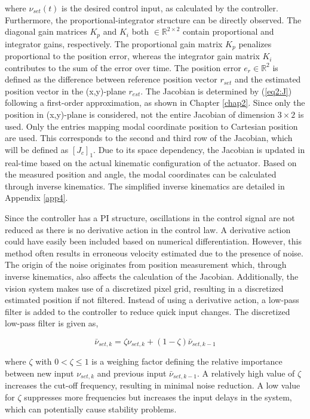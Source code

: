 where $\nu_{set}(t)$ is the desired control input, as calculated by the controller. Furthermore, the proportional-integrator structure can be directly observed. The diagonal gain matrices $K_p$ and $K_i$ both  $ \in \mathbb{R}^{2\times 2}$ contain proportional and integrator gains, respectively. The proportional gain matrix $K_p$ penalizes proportional to the position error, whereas the integrator gain matrix $K_i$ contributes to the sum of the error over time. The position error $e_r \in \mathbb{R}^2$ is defined as the difference between reference position vector $r_{set}$ and the estimated position vector in the (x,y)-plane $r_{est}$. The Jacobian is determined by (\ref{eq2:J}) following a first-order approximation, as shown in Chapter \ref{chap2}. Since only the position in (x,y)-plane is considered, not the entire Jacobian of dimension $3 \times 2$ is used. Only the entries mapping modal coordinate position to Cartesian position are used. This corresponds to the second and third row of the Jacobian, which will be defined as $[J_c]_1$. Due to its space dependency, the Jacobian is updated in real-time based on the actual kinematic configuration of the actuator. Based on the measured position and angle, the modal coordinates can be calculated through inverse kinematics. The simplified inverse kinematics are detailed in Appendix \ref{app4}.

Since the controller has a PI structure, oscillations in the control signal are not reduced as there is no derivative action in the control law. A derivative action could have easily been included based on numerical differentiation. However, this method often results in erroneous velocity estimated due to the presence of noise. The origin of the noise originates from position measurement which, through inverse kinematics, also affects the calculation of the Jacobian. Additionally, the vision system makes use of a discretized pixel grid, resulting in a discretized estimated position if not filtered. Instead of using a derivative action, a low-pass filter is added to the controller to reduce quick input changes. The discretized low-pass filter is given as,

\begin{equation}
\bar{\nu}_{set,k} = \zeta \nu_{set,k} + (1-\zeta)\bar{\nu}_{set,k-1}
\label{eq4:lowpass}
\end{equation}

where $\zeta$ with $ 0 < \zeta \leq 1$ is a weighing factor defining the relative importance between new input $\nu_{set,k}$ and previous input $\bar{\nu}_{set,k-1}$. A relatively high value of $\zeta$ increases the cut-off frequency, resulting in minimal noise reduction. A low value for $\zeta$ suppresses more frequencies but increases the input delays in the system, which can potentially cause stability problems. 



